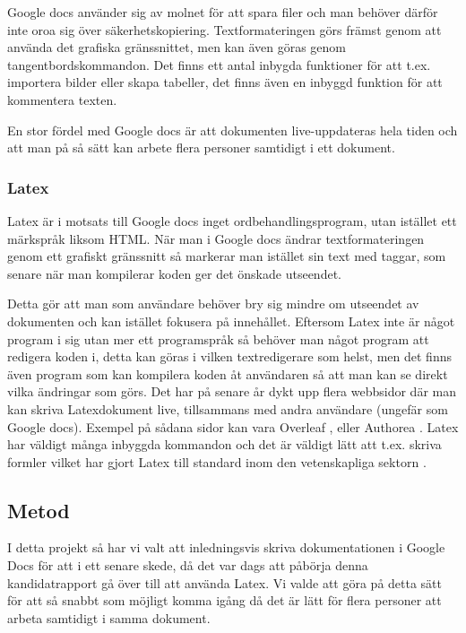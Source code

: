 Google docs använder sig av molnet för att spara filer och man behöver därför inte oroa sig över säkerhetskopiering. Textformateringen görs främst genom att använda det grafiska gränssnittet, men kan även göras genom tangentbordskommandon. Det finns ett antal inbygda funktioner för att t.ex. importera bilder eller skapa tabeller, det finns även en inbyggd funktion för att kommentera texten.

En stor fördel med Google docs är att dokumenten live-uppdateras hela tiden och att man på så sätt kan arbete flera personer samtidigt i ett dokument.

\subsubsection{Latex}
Latex är i motsats till Google docs inget ordbehandlingsprogram, utan istället ett märkspråk liksom HTML. När man i Google docs ändrar textformateringen genom ett grafiskt gränssnitt så markerar man istället sin text med taggar, som senare när man kompilerar koden ger det önskade utseendet. 

	
Detta gör att man som användare behöver bry sig mindre om utseendet av dokumenten och kan istället fokusera på innehållet. Eftersom Latex inte är något program i sig utan mer ett programspråk så behöver man något program att redigera koden i, detta kan göras i vilken textredigerare som helst, men det finns även program som kan kompilera koden åt användaren så att man kan se direkt vilka ändringar som görs. Det har på senare år dykt upp flera webbsidor där man kan skriva Latexdokument live, tillsammans med andra användare (ungefär som Google docs). Exempel på sådana sidor kan vara Overleaf \cite{overleaf}, eller Authorea \cite{authorea}. Latex har väldigt många inbyggda kommandon och det är väldigt lätt att t.ex. skriva formler vilket har gjort Latex till standard inom den vetenskapliga sektorn \cite{latex_standard}.


\subsection{Metod}
I detta projekt så har vi valt att inledningsvis skriva dokumentationen i Google Docs för att i ett senare skede, då det var dags att påbörja denna kandidatrapport gå över till att använda Latex. Vi valde att göra på detta sätt för att så snabbt som möjligt komma igång då det är lätt  för flera personer att arbeta samtidigt i samma dokument.

